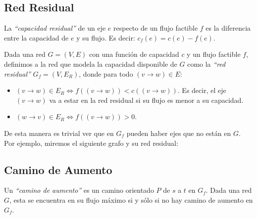 
\subsection{Red Residual}

La \emph{``capacidad residual''} de un eje $e$ respecto de un flujo factible $f$ es la diferencia entre la capacidad de $e$ y su flujo. Es decir: $c_f(e) = c(e) - f(e)$.

Dada una red $G = (V, E)$ con una funci\'on de capacidad $c$ y un flujo factible $f$, definimos a la red que modela la capacidad disponible de $G$ como la \emph{``red residual''} $G_f = (V, E_{R})$, donde para todo $(v \rightarrow w) \in E$:

\begin{itemize}
\item $(v \rightarrow w) \in E_R \Longleftrightarrow f((v \rightarrow w)) < c((v \rightarrow w))$. Es decir, el eje $(v \rightarrow w)$ va a estar en la red residual si su flujo es menor a su capacidad.
\item $(w \rightarrow v) \in E_R \Longleftrightarrow f((v \rightarrow w)) > 0$.
\end{itemize}

De esta manera es trivial ver que en $G_f$ pueden haber ejes que no est\'an en $G$. Por ejemplo, miremos el siguiente grafo y su red residual:

\raggedright
  \bigskip
  \begin{center}
  \end{center}


  \raggedright
  \bigskip


\subsection{Camino de Aumento}

Un \emph{``camino de aumento''} es un camino orientado $P$ de $s$ a $t$ en $G_f$. Dada una red $G$, esta se encuentra en su flujo m\'aximo si y s\'olo si no hay camino de aumento en $G_f$.

